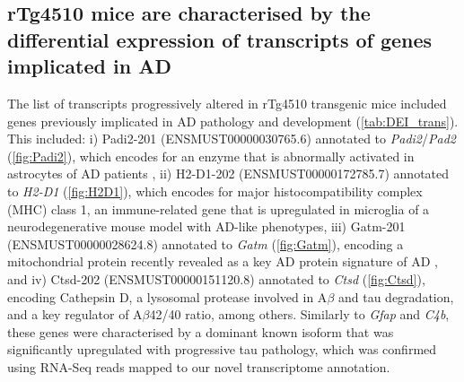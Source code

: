 \clearpage
\subsection{rTg4510 mice are characterised by the differential expression of transcripts of genes implicated in AD}
\label{ch5: diffisoexp}
The list of transcripts progressively altered in rTg4510 transgenic mice included genes previously implicated in AD pathology and development (\cref{tab:DEI_trans}). This included: i) Padi2-201 (ENSMUST00000030765.6) annotated to \textit{Padi2}/\textit{Pad2} (\cref{fig:Padi2}), which encodes for an enzyme that is abnormally activated in astrocytes of AD patients \cite{A2005}, ii) H2-D1-202 (ENSMUST00000172785.7) annotated to \textit{H2-D1} (\cref{fig:H2D1}), which encodes for major histocompatibility complex (MHC) class 1, an immune-related gene that is upregulated in microglia of a neurodegenerative mouse model with AD-like phenotypes\cite{Mathys2017}, iii) Gatm-201 (ENSMUST00000028624.8) annotated to \textit{Gatm} (\cref{fig:Gatm}), encoding a mitochondrial protein recently revealed as a key AD protein signature of AD \cite{Wang2020}, and iv) Ctsd-202 (ENSMUST00000151120.8) annotated to \textit{Ctsd} (\cref{fig:Ctsd}), encoding Cathepsin D, a lysosomal protease involved in A$\beta$ \cite{JR1996} and tau \cite{A1997} degradation, and a key regulator of A$\beta$42/40 ratio\cite{Suire2020}, among others. Similarly to \textit{Gfap} and \textit{C4b}, these genes were characterised by a dominant known isoform that was significantly upregulated with progressive tau pathology, which was confirmed using RNA-Seq reads mapped to our novel transcriptome annotation. 


